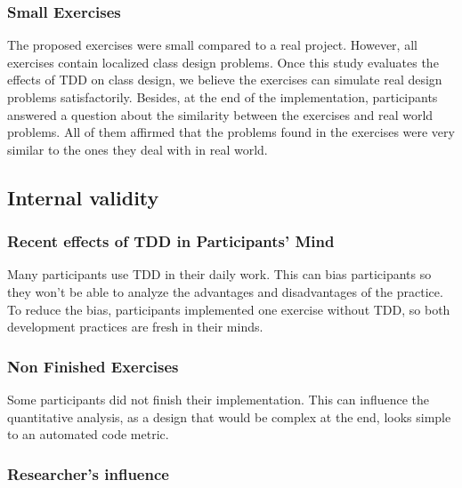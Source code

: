 \documentclass[times]{elsarticle}
\begin{document}
\subsubsection{Small Exercises}

The proposed exercises were small compared to a real project. However, all exercises
contain localized class design problems. Once this study evaluates the effects
of TDD on class design, we believe the exercises can simulate real design problems
satisfactorily.
Besides, at the end of the implementation, participants answered a question about the
similarity between the exercises and real world problems. All of them affirmed that
the problems found in the exercises were very similar to the ones they deal with in real world.

\subsection{Internal validity}

\subsubsection{Recent effects of TDD in Participants' Mind}

Many participants use TDD in their daily work. This can bias participants so they
won't be able to analyze the advantages and disadvantages of the practice.
To reduce the bias, participants implemented one exercise without TDD, so both
development practices are fresh in their minds.

\subsubsection{Non Finished Exercises}

Some participants did not finish their implementation. This can influence the
quantitative analysis, as a design that would be complex at the end, looks simple
to an automated code metric.

\subsubsection{Researcher's influence}
\end{document}
